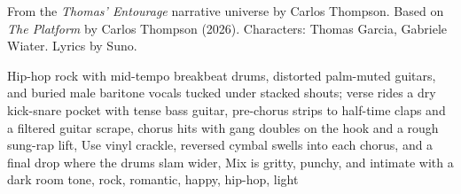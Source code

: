 
\begin{notes}
From the \emph{Thomas’ Entourage} narrative universe by Carlos Thompson. Based on \emph{The Platform} by Carlos Thompson (2026). Characters: Thomas Garcia, Gabriele Wiater. Lyrics by Suno.
\end{notes}
\begin{style}
Hip-hop rock with mid-tempo breakbeat drums, distorted palm-muted guitars, and buried male baritone vocals tucked under stacked shouts; verse rides a dry kick-snare pocket with tense bass guitar, pre-chorus strips to half-time claps and a filtered guitar scrape, chorus hits with gang doubles on the hook and a rough sung-rap lift, Use vinyl crackle, reversed cymbal swells into each chorus, and a final drop where the drums slam wider, Mix is gritty, punchy, and intimate with a dark room tone, rock, romantic, happy, hip-hop, light
\end{style}

